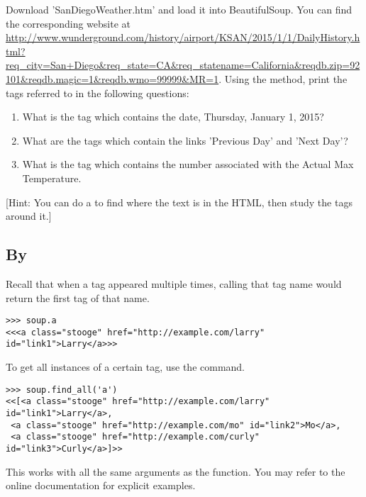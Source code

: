 \begin{problem}
Download 'SanDiegoWeather.htm' and load it into BeautifulSoup.
You can find the corresponding website at \url{http://www.wunderground.com/history/airport/KSAN/2015/1/1/DailyHistory.html?req_city=San+Diego&req_state=CA&req_statename=California&reqdb.zip=92101&reqdb.magic=1&reqdb.wmo=99999&MR=1}. Using the  method, print the tags referred to in the following questions:
\begin{enumerate}
\item What is the tag which contains the date, Thursday, January 1, 2015?
\item What are the tags which contain the links 'Previous Day' and 'Next Day'?
\item What is the tag which contains the number associated with the Actual Max Temperature.
\end{enumerate}
[Hint: You can do a  to find where the text is in the HTML, then study the tags around it.]
\end{problem}

\subsection*{By }

Recall that when a tag appeared multiple times, calling that tag name would return the first tag of that name.
\begin{lstlisting}
>>> soup.a
<<<a class="stooge" href="http://example.com/larry" id="link1">Larry</a>>>
\end{lstlisting}

To get all instances of a certain tag, use the  command.
\begin{lstlisting}
>>> soup.find_all('a')
<<[<a class="stooge" href="http://example.com/larry" id="link1">Larry</a>,
 <a class="stooge" href="http://example.com/mo" id="link2">Mo</a>,
 <a class="stooge" href="http://example.com/curly" id="link3">Curly</a>]>>
\end{lstlisting}

This works with all the same arguments as the  function.
You may refer to the online documentation for explicit examples.

